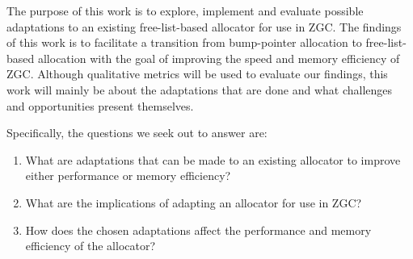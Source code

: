 


The purpose of this work is to explore, implement and evaluate possible adaptations to an existing free-list-based allocator for use in ZGC. The findings of this work is to facilitate a transition from bump-pointer allocation to free-list-based allocation with the goal of improving the speed and memory efficiency of ZGC. Although qualitative metrics will be used to evaluate our findings, this work will mainly be about the adaptations that are done and what challenges and opportunities present themselves.

Specifically, the questions we seek out to answer are:

\begin{enumerate}
    \item What are adaptations that can be made to an existing allocator to improve either performance or memory efficiency?
    \item What are the implications of adapting an allocator for use in ZGC?
    \item How does the chosen adaptations affect the performance and memory efficiency of the allocator?
\end{enumerate}

